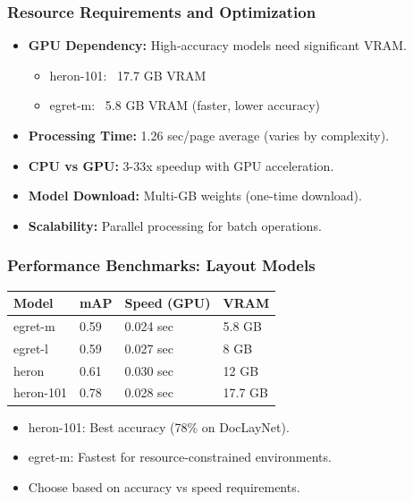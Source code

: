 \begin{frame}[fragile]\frametitle{Resource Requirements and Optimization}
      \begin{itemize}
        \item \textbf{GPU Dependency:} High-accuracy models need significant VRAM.
        \begin{itemize}
          \item heron-101: ~17.7 GB VRAM
          \item egret-m: ~5.8 GB VRAM (faster, lower accuracy)
        \end{itemize}
        \item \textbf{Processing Time:} 1.26 sec/page average (varies by complexity).
        \item \textbf{CPU vs GPU:} 3-33x speedup with GPU acceleration.
        \item \textbf{Model Download:} Multi-GB weights (one-time download).
        \item \textbf{Scalability:} Parallel processing for batch operations.
      \end{itemize}
\end{frame}

\begin{frame}[fragile]\frametitle{Performance Benchmarks: Layout Models}
\begin{table}[h]
\centering
\small
\begin{tabular}{|l|l|l|l|}
\hline
\textbf{Model} & \textbf{mAP} & \textbf{Speed (GPU)} & \textbf{VRAM} \\
\hline
egret-m & 0.59 & 0.024 sec & 5.8 GB \\
egret-l & 0.59 & 0.027 sec & 8 GB \\
heron & 0.61 & 0.030 sec & 12 GB \\
heron-101 & 0.78 & 0.028 sec & 17.7 GB \\
\hline
\end{tabular}
\end{table}
      \begin{itemize}
        \item heron-101: Best accuracy (78\% on DocLayNet).
        \item egret-m: Fastest for resource-constrained environments.
        \item Choose based on accuracy vs speed requirements.
      \end{itemize}
\end{frame}

